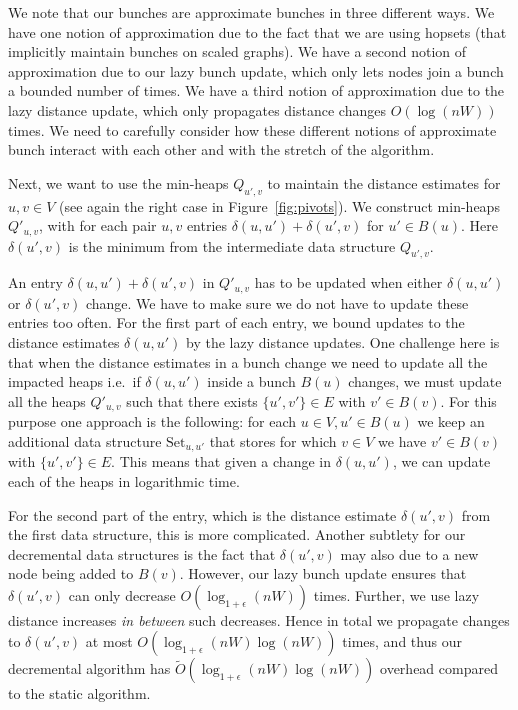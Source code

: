 \documentclass[11pt]{article}
\theoremstyle{definition}
\theoremstyle{remark}
\begin{document}
We note that our bunches are approximate bunches in three different ways. We have one notion of approximation due to the fact that we are using hopsets (that implicitly maintain bunches on scaled graphs). We have a second notion of approximation due to our lazy bunch update, which only lets nodes join a bunch a bounded number of times. We have a third notion of approximation due to the lazy distance update, which only propagates distance changes $O(\log(nW))$ times. We need to carefully consider how these different notions of approximate bunch interact with each other and with the stretch of the algorithm.

Next, we want to use the min-heaps $Q_{u',v}$ to maintain the distance estimates for $u,v\in V$ (see again the right case in Figure~\ref{fig:pivots}). We construct min-heaps $Q'_{u,v}$, with for each pair $u,v$ entries $\delta(u,u')+\delta(u',v)$ for $u' \in B(u)$. Here $\delta(u',v)$ is the minimum from the intermediate data structure $Q_{u',v}$. 

An entry $\delta(u,u')+\delta(u',v)$ in $Q'_{u,v}$ has to be updated when either $\delta(u,u')$ or $\delta(u',v)$ change. We have to make sure we do not have to update these entries too often. For the first part of each entry, we bound updates to the distance estimates $\delta(u,u')$ by the lazy distance updates. One challenge here is that when the distance estimates in a bunch change we need to update all the impacted heaps i.e.~if $\delta(u,u')$ inside a bunch $B(u)$ changes, we must update all the heaps $Q'_{u,v}$ such that there exists $\{u',v'\} \in E$ with $v'\in B(v)$. For this purpose one approach is the following: for each $u \in V,u' \in B(u)$ we keep an additional data structure $\text{Set}_{u,u'}$ that stores for which $v \in V$ we have $v' \in B(v)$ with $\{u',v'\}\in E$. This means that given a change in $\delta(u,u')$, we can update each of the heaps in logarithmic time. 


For the second part of the entry, which is the distance estimate $\delta(u',v)$ from the first data structure, this is more complicated. Another subtlety for our decremental data structures is the fact that $\delta(u',v)$ may also  due to a new node being added to $B(v)$. However, our lazy bunch update ensures that $\delta(u',v)$ can only decrease $O(\log_{1+\epsilon}(nW))$ times. Further, we use lazy distance increases \textit{in between} such decreases. Hence in total we propagate changes to $\delta(u',v)$ at most $O(\log_{1+\epsilon}(nW)\log(nW))$ times, and thus our decremental algorithm has $\tilde O(\log_{1+\epsilon}(nW)\log(nW))$ overhead compared to the static algorithm.
\end{document}
